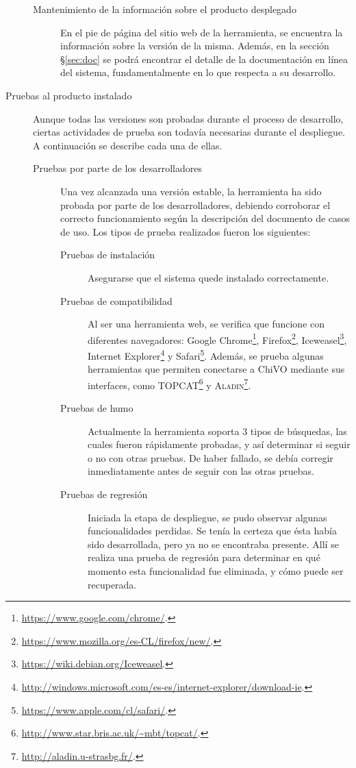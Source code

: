 \begin{description}
\begin{description}
			\item [Mantenimiento de la información sobre el producto desplegado] En el pie de página del sitio web de la herramienta, se encuentra la información sobre la versión de la misma. Además, en la sección \S\ref{sec:doc} se podrá encontrar el detalle de la documentación en línea del sistema, fundamentalmente en lo que respecta a su desarrollo.
		\end{description}
	\item [Pruebas al producto instalado] Aunque todas las versiones son probadas durante el proceso de desarrollo, ciertas actividades de prueba son todavía necesarias durante el despliegue. A continuación se describe cada una de ellas.
		\begin{description}
			\item [Pruebas por parte de los desarrolladores] Una vez alcanzada una versión estable, la herramienta ha sido probada por parte de los desarrolladores, debiendo corroborar el correcto funcionamiento según la descripción del documento de casos de uso. Los tipos de prueba realizados fueron los siguientes:
				\begin{description}
					\item[Pruebas de instalación] Asegurarse que el sistema quede instalado correctamente.
					\item[Pruebas de compatibilidad] Al ser una herramienta web, se verifica que funcione con diferentes navegadores: Google Chrome\footnote{\url{https://www.google.com/chrome/}.}, Firefox\footnote{\url{https://www.mozilla.org/es-CL/firefox/new/}.}, Iceweasel\footnote{\url{https://wiki.debian.org/Iceweasel}.}, Internet Explorer\footnote{\url{http://windows.microsoft.com/es-es/internet-explorer/download-ie}.} y Safari\footnote{\url{https://www.apple.com/cl/safari/}.}. Además, se prueba algunas herramientas que permiten conectarse a ChiVO mediante sus interfaces, como \textsc{TOPCAT}\footnote{\url{http://www.star.bris.ac.uk/~mbt/topcat/}.} y \textsc{Aladin}\footnote{\url{http://aladin.u-strasbg.fr/}.}.
					\item[Pruebas de humo] Actualmente la herramienta soporta 3 tipos de búsquedas, las cuales fueron rápidamente probadas, y así determinar si seguir o no con otras pruebas. De haber fallado, se debía corregir inmediatamente antes de seguir con las otras pruebas.
					\item[Pruebas de regresión] Iniciada la etapa de despliegue, se pudo observar algunas funcionalidades perdidas. Se tenía la certeza que \'esta había sido desarrollada, pero ya no se encontraba presente. Allí se realiza una prueba de regresión para determinar en qu\'e momento esta funcionalidad fue eliminada, y cómo puede ser recuperada.

\end{description}
\end{description}
\end{description}
